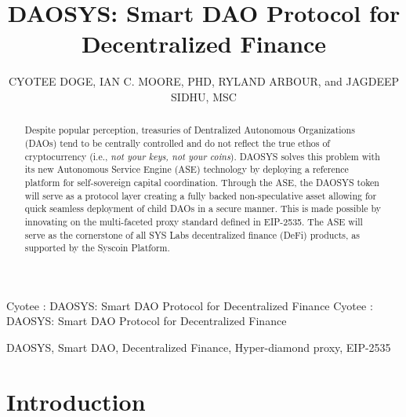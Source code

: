 \documentclass[journal,twocolumn,12pt]{ieeesyscoin}
\begin{document}
\linenumbers
\history{}

\title{\centering DAOSYS: Smart DAO Protocol for Decentralized Finance}
\author{\centering  \uppercase{Cyotee Doge}, 
\uppercase{Ian C. Moore, PhD},
\uppercase{Ryland Arbour}, and
\uppercase{Jagdeep Sidhu, MSc}}

\address[1]{\centering DAO Advisor, Syscoin Platform (e-mail: cyotee@syscoin.org)}
\address[2]{\centering  Syscoin Researcher, Syscoin Platform (e-mail: imoore@syscoin.org)}
\address[3]{\centering  L2 Advisor, Syscoin Platform (e-mail: rylandarbour@syscoin.com)}
\address[4]{\centering Syscoin Lead Developer, (e-mail: sidhujag@syscoin.org)}
\tfootnote{}

\markboth
{Cyotee \headeretal: DAOSYS: Smart DAO Protocol for Decentralized Finance}
{Cyotee \headeretal: DAOSYS: Smart DAO Protocol for Decentralized Finance}

\corresp{}

\begin{abstract}
Despite popular perception, treasuries of Dentralized Autonomous Organizations (DAOs) tend to be centrally controlled and do not reflect the true ethos of cryptocurrency (i.e., \textit{not your keys, not your coins}). DAOSYS solves this problem with its new Autonomous Service Engine (ASE) technology by deploying a reference platform for self-sovereign capital coordination. Through the ASE, the DAOSYS token will serve as a protocol layer creating a fully backed non-speculative asset allowing for quick seamless deployment of child DAOs in a secure manner. This is made possible by innovating on the multi-faceted proxy standard defined in EIP-2535. The ASE will serve as the cornerstone of all SYS Labs decentralized finance (DeFi) products, as supported by the Syscoin Platform.
\end{abstract}

\begin{keywords}
DAOSYS, Smart DAO, Decentralized Finance, Hyper-diamond proxy, EIP-2535
\end{keywords}

\titlepgskip=-15pt

\maketitle

\section{Introduction}
\label{sec:introduction}
\end{document}
